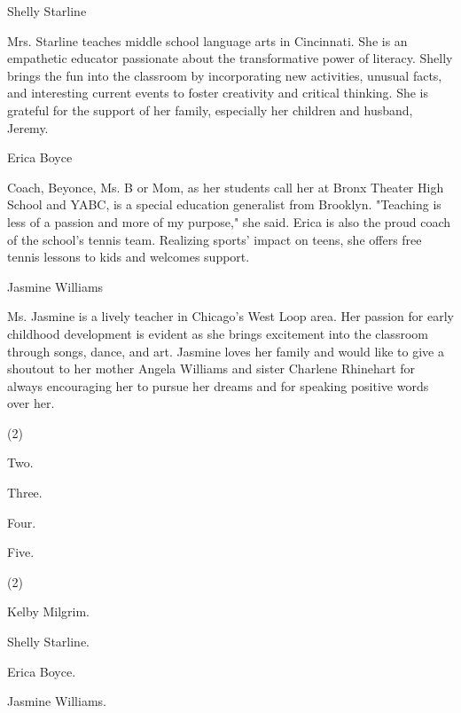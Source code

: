 \documentclass{英语试卷}
\begin{document}
\par Shelly Starline\par
\par Mrs. Starline teaches middle school language arts in Cincinnati. She is an empathetic educator passionate about the transformative power of literacy. Shelly brings the fun into the classroom by incorporating new activities, unusual facts, and interesting current events to foster creativity and critical thinking. She is grateful for the support of her family, especially her children and husband, Jeremy.\par
\par Erica Boyce\par
\par Coach, Beyonce, Ms. B or Mom, as her students call her at Bronx Theater High School and YABC, is a special education generalist from Brooklyn. "Teaching is less of a passion and more of my purpose," she said. Erica is also the proud coach of the school's tennis team. Realizing sports' impact on teens, she offers free tennis lessons to kids and welcomes support.\par
\par Jasmine Williams\par
\par Ms. Jasmine is a lively teacher in Chicago's West Loop area. Her passion for early childhood development is evident as she brings excitement into the classroom through songs, dance, and art. Jasmine loves her family and would like to give a shoutout to her mother Angela Williams and sister Charlene Rhinehart for always encouraging her to pursue her dreams and for speaking positive words over her.\par
{}
\begin{choices}(2)
  \item Two.
  \item Three.
  \item Four.
  \item Five.
\end{choices}
\begin{choices}(2)
  \item Kelby Milgrim.
  \item Shelly Starline.
  \item Erica Boyce.
  \item Jasmine Williams.
\end{choices}
\end{document}
